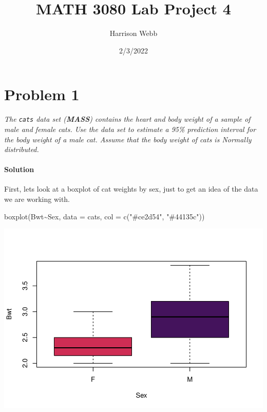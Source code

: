 \documentclass[
]{article}
\title{MATH 3080 Lab Project 4}
\author{Harrison Webb}
\date{2/3/2022}
\newenvironment{Shaded}{\begin{snugshade}}{\end{snugshade}}
\newcommand{\AttributeTok}[1]{\textcolor[rgb]{0.77,0.63,0.00}{#1}}
\newcommand{\FunctionTok}[1]{\textcolor[rgb]{0.00,0.00,0.00}{#1}}
\newcommand{\NormalTok}[1]{#1}
\newcommand{\SpecialCharTok}[1]{\textcolor[rgb]{0.00,0.00,0.00}{#1}}
\newcommand{\StringTok}[1]{\textcolor[rgb]{0.31,0.60,0.02}{#1}}
\begin{document}
\maketitle

{
\setcounter{tocdepth}{2}
\tableofcontents
}
\hypertarget{problem-1}{%
\section{Problem 1}\label{problem-1}}

\emph{The \texttt{cats} data set (\textbf{MASS}) contains the heart and
body weight of a sample of male and female cats. Use the data set to
estimate a 95\% prediction interval for the body weight of a male cat.
Assume that the body weight of cats is Normally distributed.}

\hypertarget{solution}{%
\paragraph{Solution}\label{solution}}

First, lets look at a boxplot of cat weights by sex, just to get an idea
of the data we are working with.

\begin{Shaded}
\begin{Highlighting}[]
\FunctionTok{boxplot}\NormalTok{(Bwt}\SpecialCharTok{\textasciitilde{}}\NormalTok{Sex, }\AttributeTok{data =}\NormalTok{ cats, }\AttributeTok{col =} \FunctionTok{c}\NormalTok{(}\StringTok{"\#ce2d54"}\NormalTok{, }\StringTok{"\#44135c"}\NormalTok{))}
\end{Highlighting}
\end{Shaded}

\begin{center}\includegraphics[width=0.75\linewidth]{3080Project4_StatisticalIntervals_files/figure-latex/unnamed-chunk-2-1} \end{center}
\end{document}
